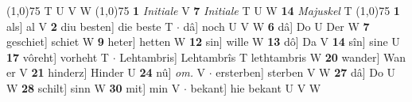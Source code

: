 \documentclass[8pt,a4paper,notitlepage]{article}
\begin{document}
\begin{table}[ht]
\begin{minipage}[t]{0.5\linewidth}
\begin{tabular}{rl}
\end{tabular}
\scriptsize
\line(1,0){75} \newline
T U V W \newline
\line(1,0){75} \newline
\textbf{1} \textit{Initiale} V  \textbf{7} \textit{Initiale} T U W  \textbf{14} \textit{Majuskel} T  \newline
\line(1,0){75} \newline
\textbf{1} als] al V \textbf{2} diu besten] die beste T  $\cdot$ dâ] noch U V W \textbf{6} dâ] Do U Der W \textbf{7} geschiet] schiet W \textbf{9} heter] hetten W \textbf{12} sin] wille W \textbf{13} dô] Da V \textbf{14} sîn] sine U \textbf{17} vôreht] vorheht T  $\cdot$ Lehtambris] Lehtambrîs T lethtambris W \textbf{20} wander] Wan er V \textbf{21} hinderz] Hinder U \textbf{24} nû] \textit{om.} V  $\cdot$ ersterben] sterben V W \textbf{27} dâ] Do U W \textbf{28} schilt] sinn W \textbf{30} mit] min V  $\cdot$ bekant] hie bekant U V W \newline
\end{minipage}
\end{table}
\end{document}
